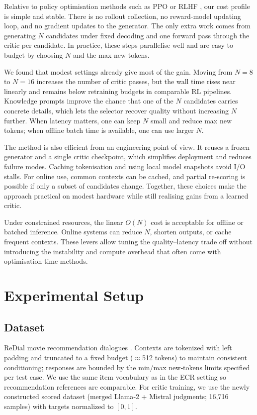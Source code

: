 \documentclass[12pt]{article}
\begin{document}
  Relative to policy optimisation methods such as PPO or RLHF \citep{ppo_wikipedia,rlhf_wikipedia}, our cost profile is simple and stable. There is no rollout collection, no reward-model updating loop, and no gradient updates to the generator. The only extra work comes from generating $N$ candidates under fixed decoding and one forward pass through the critic per candidate. In practice, these steps parallelise well and are easy to budget by choosing $N$ and the max new tokens.
  
  We found that modest settings already give most of the gain. Moving from $N=8$ to $N=16$ increases the number of critic passes, but the wall time rises near linearly and remains below retraining budgets in comparable RL pipelines. Knowledge prompts improve the chance that one of the $N$ candidates carries concrete details, which lets the selector recover quality without increasing $N$ further. When latency matters, one can keep $N$ small and reduce max new tokens; when offline batch time is available, one can use larger $N$.
  
  The method is also efficient from an engineering point of view. It reuses a frozen generator and a single critic checkpoint, which simplifies deployment and reduces failure modes. Caching tokenisation and using local model snapshots avoid I/O stalls. For online use, common contexts can be cached, and partial re-scoring is possible if only a subset of candidates change. Together, these choices make the approach practical on modest hardware while still realising gains from a learned critic.
  
  Under constrained resources, the linear $O(N)$ cost is acceptable for offline or batched inference. Online systems can reduce $N$, shorten outputs, or cache frequent contexts. These levers allow tuning the quality–latency trade off without introducing the instability and compute overhead that often come with optimisation-time methods.

  \section{Experimental Setup}
  \subsection{Dataset}
  ReDial movie recommendation dialogues \citep{charlin2018redial}. Contexts are tokenized with left padding and truncated to a fixed budget (\(\approx\)512 tokens) to maintain consistent conditioning; responses are bounded by the min/max new‑tokens limits specified per test case. We use the same item vocabulary as in the ECR setting so recommendation references are comparable. For critic training, we use the newly constructed scored dataset (merged Llama‑2 + Mistral judgments; 16{,}716 samples) with targets normalized to $[0,1]$.
  
\end{document}
